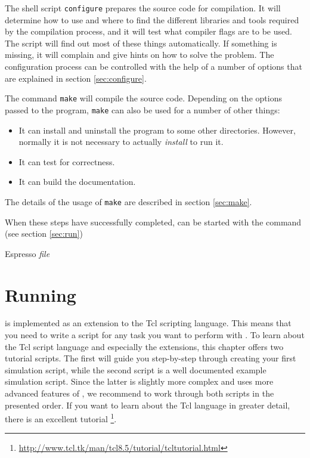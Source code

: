 The shell script \texttt{configure} prepares the source code for
compilation. It will determine how to use and where to find the
different libraries and tools required by the compilation process, and
it will test what compiler flags are to be used.  The script will find
out most of these things automatically.  If something is missing, it
will complain and give hints on how to solve the problem.  The
configuration process can be controlled with the help of a number of
options that are explained in section \vref{sec:configure}.

The command \texttt{make} will compile the source code. Depending on
the options passed to the program, \texttt{make} can also be used for
a number of other things:
\begin{itemize}
\item It can install and uninstall the program to some other
  directories. However, normally it is not necessary to actually
  \textit{install} \es to run it.
\item It can test \es for correctness.
\item It can build the documentation.
\end{itemize}
The details of the usage of \texttt{make} are described in section
\vref{sec:make}.

When these steps have successfully completed, \es can be started
with the command (see section \vref{sec:run})
\begin{code}
Espresso \textit{file}
\end{code}

\section{Running \es}

\es is implemented as an extension to the Tcl scripting language.
This means that you need to write a script for any task you want to
perform with \es. To learn about the Tcl script language and
especially the \es extensions, this chapter offers two tutorial
scripts. The first will guide you step-by-step through creating your
first simulation script, while the second script is a well documented
example simulation script. Since the latter is slightly more complex
and uses more advanced features of \es, we recommend to work through
both scripts in the presented order.  If you want to learn about the
Tcl language in greater detail, there is an excellent tutorial
\footnote{\url{http://www.tcl.tk/man/tcl8.5/tutorial/tcltutorial.html}}.

